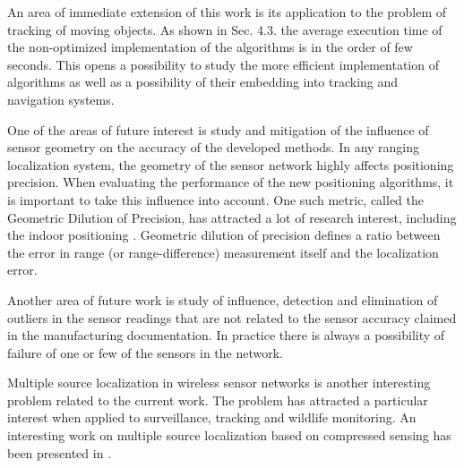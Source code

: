 An area of immediate extension of this work is its application to the problem of tracking of moving objects. As shown in Sec. 4.3. the average execution time of the non-optimized implementation of the algorithms is in the order of few seconds. This opens a possibility to study the more efficient implementation of algorithms as well as a possibility of their embedding into tracking and navigation systems.

One of the areas of future interest is study and mitigation of the influence of sensor geometry on the accuracy of the developed methods. In any ranging localization system, the geometry of the sensor network  highly affects positioning precision.   When evaluating the performance of the new positioning algorithms, it is important to  take this influence into account. One such metric, called the Geometric Dilution of Precision, has attracted a lot of research interest, including the indoor positioning \cite{Sharp, Sharp2}. Geometric dilution of precision defines a ratio between the error in range (or range-difference) measurement itself and the localization error.

Another area of future work is study of influence, detection  and elimination of outliers in the sensor readings that are not related to the sensor accuracy claimed in the manufacturing documentation. In practice there is always a possibility of failure of one or few of the sensors in the network. 

Multiple source localization in wireless sensor networks is another interesting problem related to the current work. The problem has attracted a particular interest when applied to surveillance, tracking and wildlife monitoring. An interesting work on multiple source localization based on compressed sensing has been presented in \cite{LiuCS, LinCai}.



